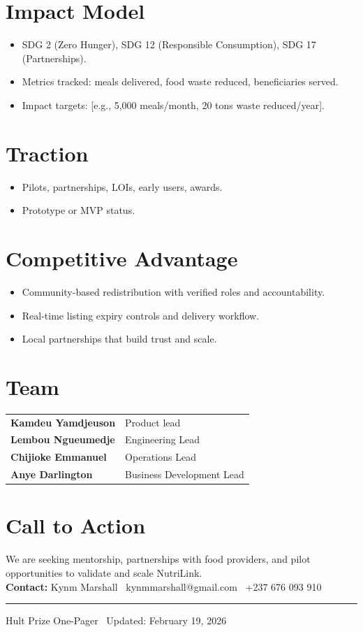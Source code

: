 \documentclass[11pt,a4paper]{article}
\begin{document}
\begin{minipage}[t]{0.48\textwidth}
\footnotesize
\section*{Impact Model}
\begin{itemize}
    \item SDG 2 (Zero Hunger), SDG 12 (Responsible Consumption), SDG 17 (Partnerships).
    \item Metrics tracked: meals delivered, food waste reduced, beneficiaries served.
    \item Impact targets: [e.g., 5,000 meals/month, 20 tons waste reduced/year].
\end{itemize}

\section*{Traction}
\begin{itemize}
    \item Pilots, partnerships, LOIs, early users, awards.
    \item Prototype or MVP status.
\end{itemize}

\section*{Competitive Advantage}
\begin{itemize}
    \item Community-based redistribution with verified roles and accountability.
    \item Real-time listing expiry controls and delivery workflow.
    \item Local partnerships that build trust and scale.
\end{itemize}

\section*{Team}
\begin{tabularx}{\textwidth}{>{\bfseries}l X}
Kamdeu Yamdjeuson & Product lead\\
Lembou Ngueumedje & Engineering Lead \\
Chijioke Emmanuel & Operations Lead \\
Anye Darlington & Business Development Lead \\

\end{tabularx}

\section*{Call to Action}
\justifying
We are seeking mentorship, partnerships with food providers, and pilot opportunities to validate and scale NutriLink.\\[4pt]
\textbf{Contact:} Kynm Marshall \textbar\ kynmmarshall@gmail.com \textbar\ +237 676 093 910
\end{minipage}

\vspace{4pt}
{\color{accent}\rule{\textwidth}{0.6pt}}
\vspace{3pt}
\small\color{muted}Hult Prize One-Pager \textbar\ Updated: February 19, 2026
\end{document}

